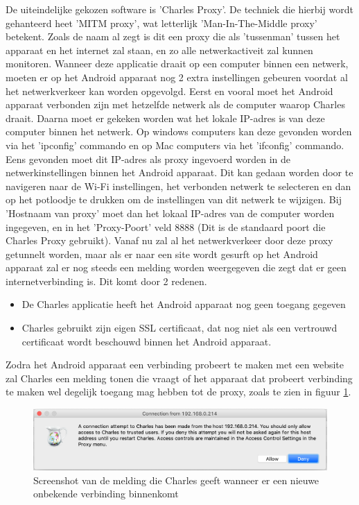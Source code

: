 De uiteindelijke gekozen software is 'Charles Proxy'. De techniek die hierbij wordt gehanteerd heet 'MITM proxy', wat letterlijk 'Man-In-The-Middle proxy' betekent. Zoals de naam al zegt is dit een proxy die als 'tussenman' tussen het apparaat en het internet zal staan, en zo alle netwerkactiveit zal kunnen monitoren. Wanneer deze applicatie draait op een computer binnen een netwerk, moeten er op het Android apparaat nog 2 extra instellingen gebeuren voordat al het netwerkverkeer kan worden opgevolgd. Eerst en vooral moet het Android apparaat verbonden zijn met hetzelfde netwerk als de computer waarop Charles draait. Daarna moet er gekeken worden wat het lokale IP-adres is van deze computer binnen het netwerk. Op windows computers kan deze gevonden worden via het 'ipconfig' commando en op Mac computers via het 'ifconfig' commando. Eens gevonden moet dit IP-adres als proxy ingevoerd worden in de netwerkinstellingen binnen het Android apparaat. Dit kan gedaan worden door te navigeren naar de Wi-Fi instellingen, het verbonden netwerk te selecteren en dan op het potloodje te drukken om de instellingen van dit netwerk te wijzigen. Bij 'Hostnaam van proxy' moet dan het lokaal IP-adres van de computer worden ingegeven, en in het 'Proxy-Poort' veld 8888 (Dit is de standaard poort die Charles Proxy gebruikt). Vanaf nu zal al het netwerkverkeer door deze proxy getunnelt worden, maar als er naar een site wordt gesurft op het Android apparaat zal er nog steeds een melding worden weergegeven die zegt dat er geen internetverbinding is. Dit komt door 2 redenen.

\begin{itemize}
    \item De Charles applicatie heeft het Android apparaat nog geen toegang gegeven
    \item Charles gebruikt zijn eigen SSL certificaat, dat nog niet als een vertrouwd certificaat wordt beschouwd binnen het Android apparaat.
\end{itemize}

Zodra het Android apparaat een verbinding probeert te maken met een website zal Charles een melding tonen die vraagt of het apparaat dat probeert verbinding te maken wel degelijk toegang mag hebben tot de proxy, zoals te zien in figuur \ref{fig:charlesmelding}.

\begin{figure}
    \centering
    \includegraphics[width=1\textwidth]{img/charlesmelding.png}
    \caption{Screenshot van de melding die Charles geeft wanneer er een nieuwe onbekende verbinding binnenkomt}
    \label{fig:charlesmelding}
\end{figure}

